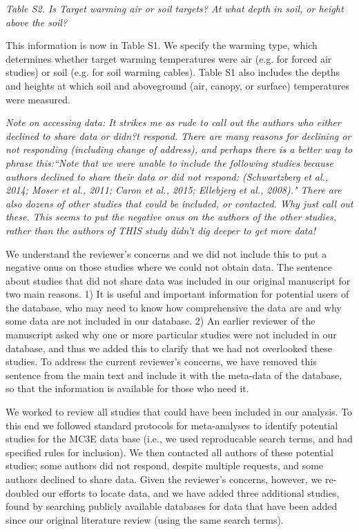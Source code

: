 \documentclass[11pt,a4paper]{letter}
\begin{document}
\begin{letter}{}
\par \emph{Table S2.  Is Target warming air or soil targets?  At what depth in soil, or height above the soil?}

\par This information is now in Table S1. We specify the warming type, which determines whether target warming temperatures were air (e.g. for forced air studies) or soil (e.g. for soil warming cables). Table S1 also includes the depths and heights at which soil and aboveground (air, canopy, or surface) temperatures were measured. 

\par \emph{Note on accessing data:  It strikes me as rude to call out the authors who either declined to share data or didn?t respond.  There are many reasons for declining or not responding (including change of address), and perhaps there is a better way to phrase this:``Note that we were unable to include the following studies because authors declined to share their data or did not respond: (Schwartzberg et al., 2014; Moser et al., 2011; Caron et al., 2015; Ellebjerg et al., 2008)." There are also dozens of other studies that could be included, or contacted.  Why just call out these.  This seems to put the negative onus on the authors of the other studies, rather than the authors of THIS study didn't dig deeper to get more data!}

\par We understand the reviewer's concerns and we did not include this to put a negative onus on those studies where we could not obtain data.  The sentence about studies that did not share data was included in our original manuscript for two main reasons. 1) It is useful and important information for potential users of the database, who may need to know how comprehensive the data are and why some data are not included in our database. 2) An earlier reviewer of the manuscript asked why one or more particular studies were not included in our database, and thus we added this to clarify that we had not overlooked these studies. To address the current reviewer's concerns, we have removed this sentence from the main text and include it with the meta-data of the database, so that the information is available for those who need it.

\par We worked to review all studies that could have been included in our analysis. To this end we followed standard protocols for meta-analyses to identify potential studies for the MC3E data base (i.e., we used reproducable search terms, and had specified rules for inclusion). We then contacted all authors of these potential studies; some authors did not respond, despite multiple requests, and some authors declined to share data.  Given the reviewer's concerns, however, we re-doubled our efforts to locate data, and we have added three additional studies, found by searching publicly available databases for data that have been added since our original literature review (using the same search terms). 


\end{letter}
\end{document}
